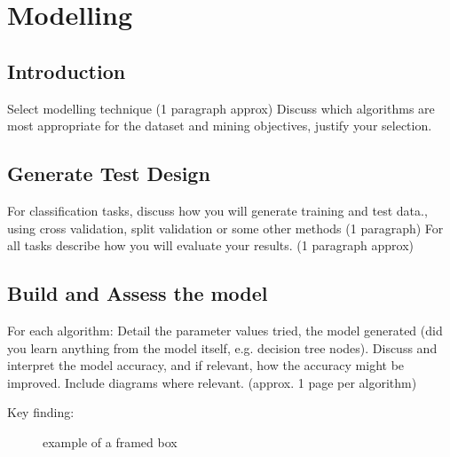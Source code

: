 \chapter{Modelling}
\label{chpt:model}
\graphicspath{{Chapter4/Chapter4Figs/PNG/}{Chapter4/Chapter4Figs/PDF/}{Chapter4/Chapter4Figs/}}


\section{Introduction}
Select modelling technique (1 paragraph approx)
Discuss which algorithms are most appropriate for the dataset and mining objectives, justify your selection.

\section{Generate Test Design}
For classification tasks, discuss how you will generate training and test data., using cross validation, split validation or some other methods  (1 paragraph)
For all tasks describe how you will evaluate your results. (1 paragraph approx)

\section{Build and Assess the model}
For each algorithm:
Detail the parameter values tried, the model generated (did you learn anything from the model itself, e.g. decision tree nodes). Discuss and interpret the model accuracy, and if relevant, how the accuracy might be improved. Include diagrams where relevant.  (approx. 1 page per algorithm)


\vspace{5 mm}
\begin{mdframed}[backgroundcolor=myframecolour]
\begin{description}
\item[Key finding:] example of a framed box
\end{description}
\end{mdframed}





